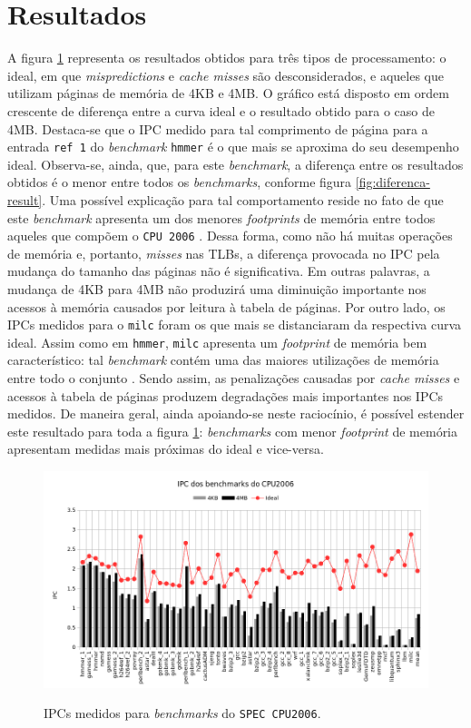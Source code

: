 \documentclass[12pt]{article}
\begin{document}
\section{Resultados}

A figura \ref{fig:ipc-result} representa os resultados obtidos para três tipos
de processamento: o ideal, em que \textit{mispredictions} e \textit{cache
misses} são desconsiderados, e aqueles que utilizam páginas de memória de 4KB e
4MB. O gráfico está disposto em ordem crescente de diferença entre a curva ideal
e o resultado obtido para o caso de 4MB. Destaca-se que o IPC medido para tal
comprimento de página para a entrada \texttt{ref 1} do \textit{benchmark}
\texttt{hmmer} é o que mais se aproxima do seu desempenho ideal. Observa-se,
ainda, que, para este \textit{benchmark}, a diferença entre os resultados
obtidos é o menor entre todos os \textit{benchmarks}, conforme figura
\ref{fig:diferenca-result}. Uma possível explicação para tal comportamento
reside no fato de que este \textit{benchmark} apresenta um dos menores
\textit{footprints} de memória entre todos aqueles que compõem o \texttt{CPU
2006} \cite{Henning:07}. Dessa forma, como não há muitas operações de memória e,
portanto, \textit{misses} nas TLBs, a diferença provocada no IPC pela mudança do
tamanho das páginas não é significativa. Em outras palavras, a mudança de 4KB
para 4MB não produzirá uma diminuição importante nos acessos à memória causados
por leitura à tabela de páginas. Por outro lado, os IPCs medidos para o
\texttt{milc} foram os que mais se distanciaram da respectiva curva ideal. Assim
como em \texttt{hmmer}, \texttt{milc} apresenta um \textit{footprint} de memória
bem característico: tal \textit{benchmark} contém uma das maiores utilizações de
memória entre todo o conjunto \cite{Henning:07}. Sendo assim, as penalizações
causadas por \textit{cache misses} e acessos à tabela de páginas produzem
degradações mais importantes nos IPCs medidos. De maneira geral, ainda
apoiando-se neste raciocínio, é possível estender este resultado para toda a
figura \ref{fig:ipc-result}: \textit{benchmarks} com menor \textit{footprint} de
memória apresentam medidas mais próximas do ideal e vice-versa.

\begin{figure}[h!]
  \centering
  \includegraphics[width=\textwidth]{img/ipc}%
  \label{fig:ipc-result}%
  \caption{IPCs medidos para \textit{benchmarks} do \texttt{SPEC CPU2006}.}
\end{figure}
\end{document}

